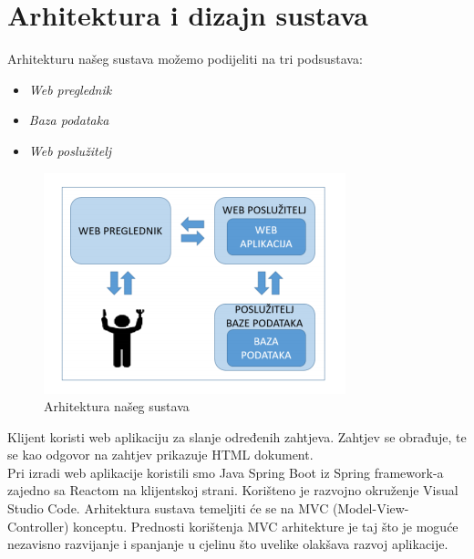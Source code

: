 \chapter{Arhitektura i dizajn sustava}
		
		Arhitekturu našeg sustava možemo podijeliti na tri podsustava:	
		\begin{itemize}
		\item 	\textit{Web preglednik}
		\item 	\textit{Baza podataka}
		\item 	\textit{Web poslužitelj}		
		\end{itemize}
		
		\begin{figure}[H]
			\centering
			\includegraphics[width=\textwidth, scale=2.0]{slike/arhitektura.png}
			\caption{Arhitektura našeg sustava}
			\label{fig:arhitektura}
		\end{figure}
\eject
	
	
	
	{Klijent koristi web aplikaciju za slanje određenih zahtjeva. Zahtjev se obrađuje, te se kao odgovor na zahtjev prikazuje HTML dokument.}
	\\
	{Pri izradi web aplikacije koristili smo Java Spring Boot iz Spring framework-a zajedno sa Reactom na klijentskoj strani. Korišteno je razvojno okruženje Visual Studio Code.}
	{Arhitektura sustava temeljiti će se na MVC (Model-View-Controller) konceptu. Prednosti korištenja MVC arhitekture je taj što je moguće nezavisno razvijanje i spanjanje u cjelinu što uvelike olakšava razvoj aplikacije.}
	
